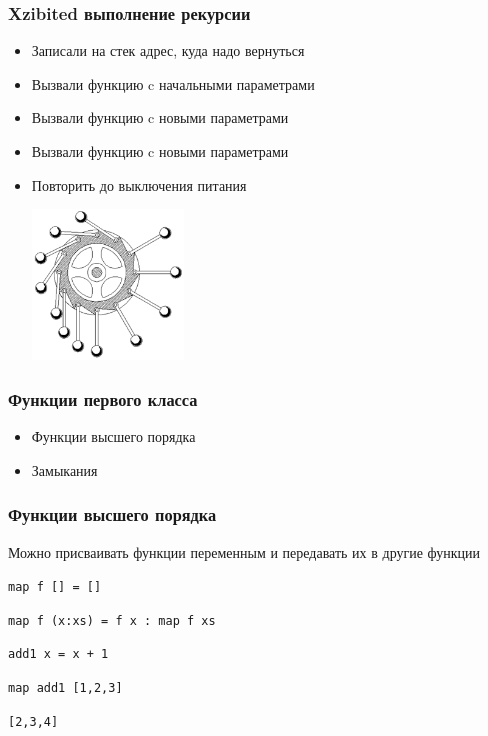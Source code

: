 \documentclass{beamer}
\begin{document}
\begin{frame}
  \frametitle{Xzibited выполнение рекурсии}
  \begin{itemize}
  \item Записали на стек адрес, куда надо вернуться
    \pause
  \item Вызвали функцию c начальными параметрами
    \pause
  \item Вызвали функцию c новыми параметрами
    \pause
  \item Вызвали функцию c новыми параметрами
    \pause
  \item Повторить до выключения питания
    \begin{center}
      \includegraphics[height=4cm]{perpetuum.png}
    \end{center}
  \end{itemize}
\end{frame}

\begin{frame}
  \frametitle{Функции первого класса}
  \begin{itemize}
  \item Функции высшего порядка
    \pause
  \item Замыкания
  \end{itemize}
\end{frame}

\begin{frame}
  \frametitle{Функции высшего порядка}
  Можно присваивать функции переменным и передавать их в другие функции
  \begin{block}{}
    \texttt{{\color{blue}map} f [] = []}

    \texttt{{\color{blue}map} f (x:xs) = f x : map f xs}
    \pause

    \texttt{{\color{blue}add1} x = x + 1}
    \pause

    \texttt{{\color{blue}map} add1 [1,2,3]}

    \texttt{[2,3,4]}
  \end{block}
\end{frame}
\end{document}
